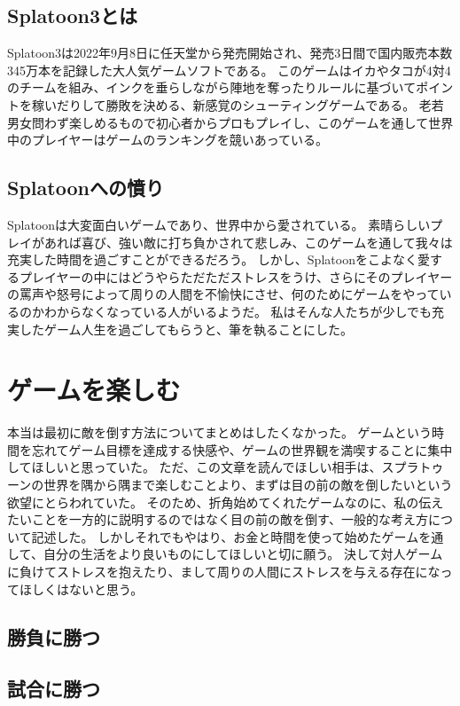 \documentclass[a4paper,11pt]{jsbook}
\begin{document}
\subsection{Splatoon3とは}
Splatoon3は2022年9月8日に任天堂から発売開始され、発売3日間で国内販売本数345万本を記録した大人気ゲームソフトである。
このゲームはイカやタコが4対4のチームを組み、インクを垂らしながら陣地を奪ったりルールに基づいてポイントを稼いだりして勝敗を決める、新感覚のシューティングゲームである。
老若男女問わず楽しめるもので初心者からプロもプレイし、このゲームを通して世界中のプレイヤーはゲームのランキングを競いあっている。

\subsection{Splatoonへの憤り}
Splatoonは大変面白いゲームであり、世界中から愛されている。
素晴らしいプレイがあれば喜び、強い敵に打ち負かされて悲しみ、このゲームを通して我々は充実した時間を過ごすことができるだろう。
しかし、Splatoonをこよなく愛するプレイヤーの中にはどうやらただただストレスをうけ、さらにそのプレイヤーの罵声や怒号によって周りの人間を不愉快にさせ、何のためにゲームをやっているのかわからなくなっている人がいるようだ。
私はそんな人たちが少しでも充実したゲーム人生を過ごしてもらうと、筆を執ることにした。


\section{ゲームを楽しむ}
本当は最初に敵を倒す方法についてまとめはしたくなかった。
ゲームという時間を忘れてゲーム目標を達成する快感や、ゲームの世界観を満喫することに集中してほしいと思っていた。
ただ、この文章を読んでほしい相手は、スプラトゥーンの世界を隅から隅まで楽しむことより、まずは目の前の敵を倒したいという欲望にとらわれていた。
そのため、折角始めてくれたゲームなのに、私の伝えたいことを一方的に説明するのではなく目の前の敵を倒す、一般的な考え方について記述した。
しかしそれでもやはり、お金と時間を使って始めたゲームを通して、自分の生活をより良いものにしてほしいと切に願う。
決して対人ゲームに負けてストレスを抱えたり、まして周りの人間にストレスを与える存在になってほしくはないと思う。
\subsection{勝負に勝つ}


\subsection{試合に勝つ}
\end{document}
